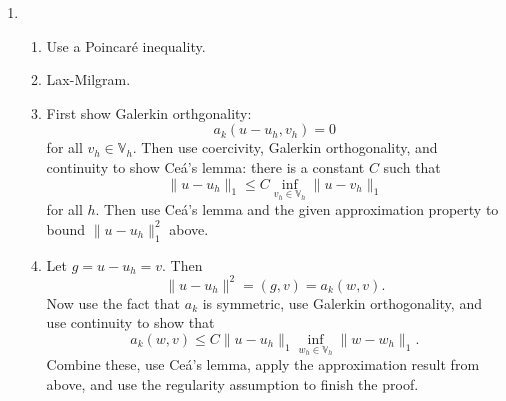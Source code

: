 \documentclass{article}
\theoremstyle{plain}
\theoremstyle{definition}
\theoremstyle{remark}
\begin{document}
\begin{enumerate}
\begin{proof}
		      Similarly, for assumption $e$, we have that $q'(x) = c(x-1)$ for some constant $c$.
		      This implies that $q(x) = (c/2)x^2 - cx + b$ for a constant $b$.
		      Setting $a = c/2$ gives us $q(x) = ax^2 - 2ax + b$.

		      For item c, we use item b and evaluate at $x = 0$ to conclude that $b = 0$.
		      For item f, we have from item d that $q(x) = (x-1)(ax+b)$ for some constants $a$ and $b$.
		      Then by taking a derivative, we have that $q'(x) = ax+b + a(x-1)$.
		      Evaluating at $x = 1$ tells us that $a + b = 0$, so that $q(x) = a(x-1)^2$ as desired.
	      \end{proof}

	      To find the shape functions, we have that shape function $\varphi_i \in P$ satisfies $\sigma_j\varphi_i = \delta_{ij}$ for all $i,j$.
	      We also have that $\varphi_i|_{K_k} = \varphi_{i,k}$ for some quadratic polynomials $\varphi_{i,k}$.
	      Use the lemma above and the equations $\sigma_j\varphi_i = 0$ to factor the $\varphi_{i,k}$ as much as possible.
	      Then use the equations
	      \begin{align*}
		      \sigma_i\varphi_i   & = 1                   \\
		      \varphi_{i,1}(1/2)  & = \varphi_{i,2}(1/2)  \\
		      \varphi_{i,1}'(1/2) & = \varphi_{i,2}'(1/2)
	      \end{align*}
	      to solve for the coefficients that appear from factoring.

	\item
	      \begin{enumerate}
		      \item
		            Use a Poincar\'e inequality.
		      \item
		            Lax-Milgram.
		      \item
		            First show Galerkin orthgonality: \[a_k(u-u_h,v_h) = 0\] for all $v_h \in \mathbb V_h$.
		            Then use coercivity, Galerkin orthogonality, and continuity to show Ce\'a's lemma: there is a constant $C$ such that \[\|u-u_h\|_1 \leq C\inf_{v_h \in \mathbb V_h}\|u-v_h\|_1\] for all $h$.
		            Then use Ce\'a's lemma and the given approximation property to bound $\|u-u_h\|_1^2$ above.
		      \item
		            Let $g = u-u_h = v$.
		            Then \[\|u-u_h\|^2 = (g,v) = a_k(w,v).\]
		            Now use the fact that $a_k$ is symmetric, use Galerkin orthogonality, and use continuity to show that \[a_k(w,v) \leq C\|u-u_h\|_1\inf_{w_h \in \mathbb V_h}\|w - w_h\|_1.\]
		            Combine these, use Ce\'a's lemma, apply the approximation result from above, and use the regularity assumption to finish the proof.
	      \end{enumerate}

\end{enumerate}
\end{document}
